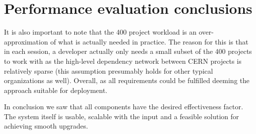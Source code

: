 \section{Performance evaluation conclusions}

It is also important to note that the 400 project workload is an
over-approximation of what is actually needed in practice. The reason for this
is that in each session, a developer actually only needs a small subset of the
400 projects to work with as the high-level dependency network between CERN
projects is relatively sparse (this assumption presumably holds for other
typical organizations as well). Overall, as all requirements could be fulfilled
deeming the approach suitable for deployment.


In conclusion we saw that all components have the desired effectiveness factor.
The system itself is usable, scalable with the input and a feasible solution for
achieving smooth upgrades. 

